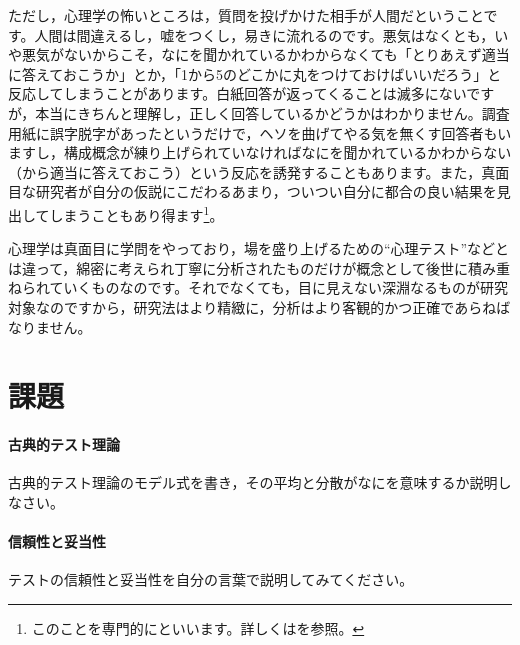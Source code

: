 \documentclass{ltjbook}
\begin{document}
ただし，心理学の怖いところは，質問を投げかけた相手が人間だということです。人間は間違えるし，嘘をつくし，易きに流れるのです。悪気はなくとも，いや悪気がないからこそ，なにを聞かれているかわからなくても「とりあえず適当に答えておこうか」とか，「1から5のどこかに丸をつけておけばいいだろう」と反応してしまうことがあります。白紙回答が返ってくることは滅多にないですが，本当にきちんと理解し，正しく回答しているかどうかはわかりません。調査用紙に誤字脱字があったというだけで，ヘソを曲げてやる気を無くす回答者もいますし，構成概念が練り上げられていなければなにを聞かれているかわからない（から適当に答えておこう）という反応を誘発することもあります。また，真面目な研究者が自分の仮説にこだわるあまり，ついつい自分に都合の良い結果を見出してしまうこともあり得ます\footnote{このことを専門的にといいます。詳しくは\citet{kosugi2018}を参照。}。

心理学は真面目に学問をやっており，場を盛り上げるための``心理テスト''などとは違って，綿密に考えられ丁寧に分析されたものだけが概念として後世に積み重ねられていくものなのです。それでなくても，目に見えない深淵なるものが研究対象なのですから，研究法はより精緻に，分析はより客観的かつ正確であらねばなりません。

\section{課題}
\paragraph{古典的テスト理論}古典的テスト理論のモデル式を書き，その平均と分散がなにを意味するか説明しなさい。
\paragraph{信頼性と妥当性}テストの信頼性と妥当性を自分の言葉で説明してみてください。
\end{document}
